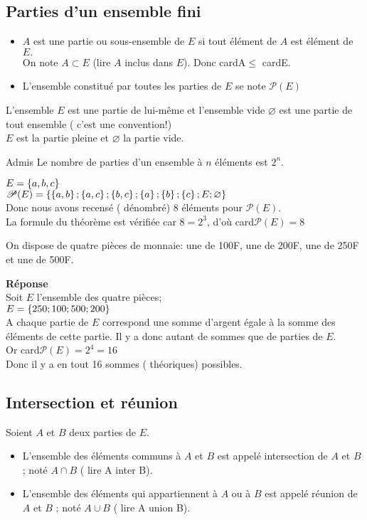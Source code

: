 \subsection*{Parties d'un ensemble fini}
\begin{itemize}
\item $ A $ est une partie ou sous-ensemble de $ E $ si tout élément de $ A $ est élément de $ E. $\\ On note $ A \subset E $ (lire $ A$ inclus dans $E $). Donc  cardA$ \leq $ cardE.
\item L'ensemble constitué par toutes les parties de $ E $ se note  $ \mathscr{P}(E) $
\end{itemize}
\begin{remark}
L'ensemble $ E $ est une partie de lui-même et l'ensemble vide $ \varnothing $ est une partie de tout ensemble ( c'est une convention!)\\
$ E $ est la partie pleine et $ \varnothing $ la partie vide.
\end{remark}
\begin{theorem}{Admis}
Le nombre de parties d'un ensemble à $ n $ éléments est $ 2^{n}. $
\end{theorem}
\begin{example}
$ E= \left\{a, b, c\right\}$ \\
$ \mathscr{P}(E)= \left\{ \left\{a, b\right\};\left\{a,c\right\};\left\{b,c\right\}                            ;\left\{a\right\};\left\{b\right\};\left\{c\right\}; E ; \varnothing \right\}$\\
Donc nous avons recensé ( dénombré)  8  éléments pour $ \mathscr{P}(E) $. \\ La formule du théorème est vérifiée car $ 8= 2^{3} $, d'où card$ \mathscr{P}(E)=8 $
\end{example}
\begin{exercice}
On dispose de quatre pièces de monnaie: une de 100F, une de 200F, une de 250F et une de 500F.
\end{exercice}
\textbf{Réponse}\\ Soit $ E $ l'ensemble des quatre pièces;\\
$ E = \left\{250; 100; 500; 200\right\}$\\
A chaque partie de $ E $ correspond une somme d'argent égale à la somme des éléments de cette partie. Il y a donc autant de sommes que de parties de $ E. $\\
Or  card$ \mathscr{P}(E)=2^{4}=16 $\\
Donc il y a en tout 16 sommes ( théoriques) possibles.
\subsection*{Intersection et réunion}
Soient $A $ et $ B $ deux parties de  $E. $
\begin{itemize}
\item[\textbullet] L'ensemble des éléments communs à  $A $ et $ B $ est appelé intersection de $A $ et $ B $ ; noté $ A\cap B $  ( lire A inter B).
\item[\textbullet] L'ensemble des éléments qui appartiennent  à  $A $ ou à $ B $ est appelé réunion de $A $ et $ B $ ; noté $ A\cup  B $  ( lire A union B).
\end{itemize}


